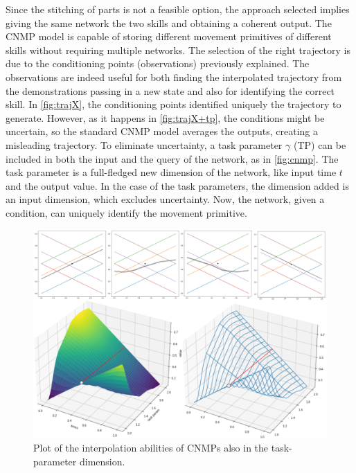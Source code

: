 Since the stitching of parts is not a feasible option, the approach selected implies giving the same network the two skills and obtaining a coherent output.
The CNMP model is capable of storing different movement primitives of different skills without requiring multiple networks. The selection of the right trajectory is due to the conditioning points (observations) previously explained. The observations are indeed useful for both finding the interpolated trajectory from the demonstrations passing in a new state and also for identifying the correct skill. In \cref{fig:trajX}, the conditioning points identified uniquely the trajectory to generate. However, as it happens in \cref{fig:trajX+tp}, the conditions might be uncertain, so the standard CNMP model averages the outputs, creating a misleading trajectory. 
To eliminate uncertainty, a task parameter $\gamma$ (TP) can be included in both the input and the query of the network, as in \cref{fig:cnmp}. The task parameter is a full-fledged new dimension of the network, like input time $t$ and the output value. In the case of the task parameters, the dimension added is an input dimension, which excludes uncertainty. Now, the network, given a condition, can uniquely identify the movement primitive.
\begin{figure}
    \centering
    \includegraphics[width=0.9\linewidth]{figures/graph-tp-dimension.jpg}
    \caption{ Plot of the interpolation abilities of CNMPs also in the task-parameter dimension. }
    \label{fig:graph-tp-transition}
\end{figure}


